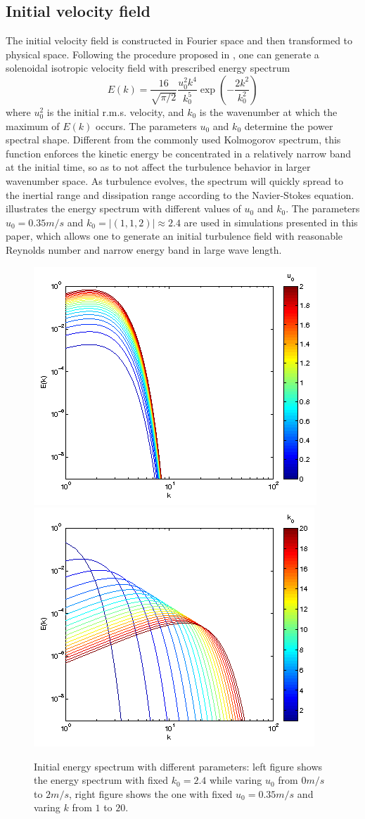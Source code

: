 \documentclass[draft,jgrga]{AGUTeX}
\begin{document}
\begin{article}
\subsection{Initial velocity field}   
The initial velocity field is constructed in Fourier space and then transformed to physical space. Following the procedure proposed in \cite{Rogallo81}, one can generate a solenoidal isotropic velocity field with prescribed energy spectrum \cite{Rosales05}
\begin{equation}
E(k) = \frac{16}{\sqrt{\pi/2}}\frac{u_0^2k^4}{k_0^5}\exp(-\frac{2k^2}{k_0^2})
\end{equation}
where $u_0^2$ is the initial r.m.s. velocity, and $k_0$ is the wavenumber at which the maximum of $E(k)$ occurs. The parameters $u_0$ and $k_0$ determine the power spectral shape. Different from the commonly used Kolmogorov spectrum, this function enforces the kinetic energy be concentrated in a relatively narrow band at the initial time, so as to not affect the turbulence behavior in larger wavenumber space. As turbulence evolves, the spectrum will quickly spread to the inertial range and dissipation range according to the Navier-Stokes equation.  illustrates the energy spectrum with different values of $u_0$ and $k_0$. The parameters $u_0 = 0.35m/s$ and $k_0 = |(1,1,2)| \approx 2.4$ are used in simulations presented in this paper, which allows one to generate an initial turbulence field with reasonable Reynolds number and narrow energy band in large wave length.
\begin{figure}\centering
\includegraphics[width=0.48\linewidth]{Figures/eng_spr_u}
\includegraphics[width=0.48\linewidth]{Figures/eng_spr_k}
\caption{Initial energy spectrum with different parameters: left figure shows the energy spectrum with fixed $k_0 = 2.4$ while varing $u_0$ from $0m/s$ to $2m/s$, right figure shows the one with fixed $u_0 = 0.35m/s$ and varing $k$ from $1$ to $20$.\label{fig:eng_spr}}
\end{figure}


\end{article}
\end{document}

